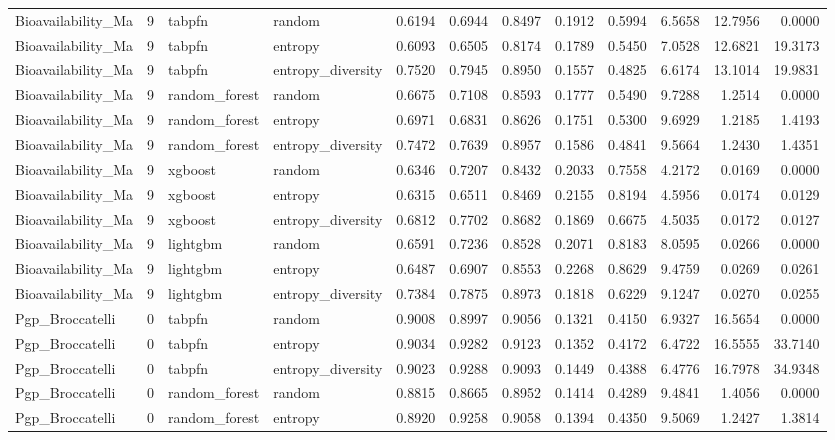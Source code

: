 \begin{tabular}{lrllrrrrrrrr}
Bioavailability_Ma & 9 & tabpfn & random & 0.6194 & 0.6944 & 0.8497 & 0.1912 & 0.5994 & 6.5658 & 12.7956 & 0.0000 \\
Bioavailability_Ma & 9 & tabpfn & entropy & 0.6093 & 0.6505 & 0.8174 & 0.1789 & 0.5450 & 7.0528 & 12.6821 & 19.3173 \\
Bioavailability_Ma & 9 & tabpfn & entropy_diversity & 0.7520 & 0.7945 & 0.8950 & 0.1557 & 0.4825 & 6.6174 & 13.1014 & 19.9831 \\
Bioavailability_Ma & 9 & random_forest & random & 0.6675 & 0.7108 & 0.8593 & 0.1777 & 0.5490 & 9.7288 & 1.2514 & 0.0000 \\
Bioavailability_Ma & 9 & random_forest & entropy & 0.6971 & 0.6831 & 0.8626 & 0.1751 & 0.5300 & 9.6929 & 1.2185 & 1.4193 \\
Bioavailability_Ma & 9 & random_forest & entropy_diversity & 0.7472 & 0.7639 & 0.8957 & 0.1586 & 0.4841 & 9.5664 & 1.2430 & 1.4351 \\
Bioavailability_Ma & 9 & xgboost & random & 0.6346 & 0.7207 & 0.8432 & 0.2033 & 0.7558 & 4.2172 & 0.0169 & 0.0000 \\
Bioavailability_Ma & 9 & xgboost & entropy & 0.6315 & 0.6511 & 0.8469 & 0.2155 & 0.8194 & 4.5956 & 0.0174 & 0.0129 \\
Bioavailability_Ma & 9 & xgboost & entropy_diversity & 0.6812 & 0.7702 & 0.8682 & 0.1869 & 0.6675 & 4.5035 & 0.0172 & 0.0127 \\
Bioavailability_Ma & 9 & lightgbm & random & 0.6591 & 0.7236 & 0.8528 & 0.2071 & 0.8183 & 8.0595 & 0.0266 & 0.0000 \\
Bioavailability_Ma & 9 & lightgbm & entropy & 0.6487 & 0.6907 & 0.8553 & 0.2268 & 0.8629 & 9.4759 & 0.0269 & 0.0261 \\
Bioavailability_Ma & 9 & lightgbm & entropy_diversity & 0.7384 & 0.7875 & 0.8973 & 0.1818 & 0.6229 & 9.1247 & 0.0270 & 0.0255 \\
Pgp_Broccatelli & 0 & tabpfn & random & 0.9008 & 0.8997 & 0.9056 & 0.1321 & 0.4150 & 6.9327 & 16.5654 & 0.0000 \\
Pgp_Broccatelli & 0 & tabpfn & entropy & 0.9034 & 0.9282 & 0.9123 & 0.1352 & 0.4172 & 6.4722 & 16.5555 & 33.7140 \\
Pgp_Broccatelli & 0 & tabpfn & entropy_diversity & 0.9023 & 0.9288 & 0.9093 & 0.1449 & 0.4388 & 6.4776 & 16.7978 & 34.9348 \\
Pgp_Broccatelli & 0 & random_forest & random & 0.8815 & 0.8665 & 0.8952 & 0.1414 & 0.4289 & 9.4841 & 1.4056 & 0.0000 \\
Pgp_Broccatelli & 0 & random_forest & entropy & 0.8920 & 0.9258 & 0.9058 & 0.1394 & 0.4350 & 9.5069 & 1.2427 & 1.3814 \\

\end{tabular}
